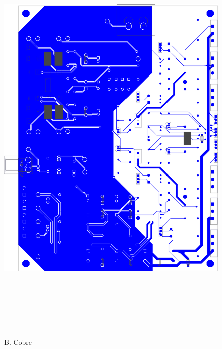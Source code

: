\begin{figure}[H]
    \centering
    \includegraphics[height=200mm, angle=0]{img/PCB/layers/amplifier/bottom-copper.png}
    \caption\footnotesize{{B. Cobre}}
    \label{fig:pcb_amp_bottom_copper}
\end{figure}

\clearpage


